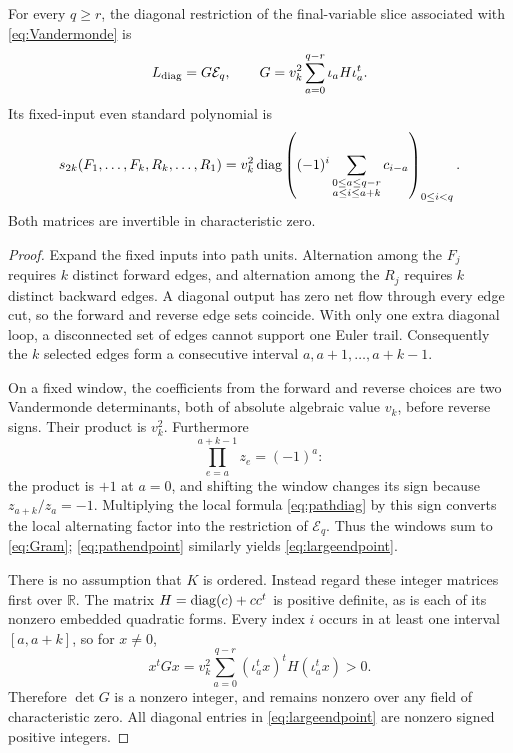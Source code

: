 \begin{proposition}\label{prop:positive}
For every $q\ge r$, the diagonal restriction of the final-variable
slice associated with \eqref{eq:Vandermonde} is
\begin{equation}\label{eq:Gram}
 L_{\rm diag}=G\mathcal E_q,
 \qquad G=v_k^2\sum_{a=0}^{q-r}\iota_aH\iota_a^t.
\end{equation}
Its fixed-input even standard polynomial is
\begin{equation}\label{eq:largeendpoint}
 s_{2k}(F_1,\ldots,F_k,R_k,\ldots,R_1)
 =v_k^2\operatorname{diag}\left((-1)^i
 \sum_{\substack{0\le a\le q-r\\a\le i\le a+k}}
 c_{i-a}\right)_{0\le i<q}.
\end{equation}
Both matrices are invertible in characteristic zero.
\end{proposition}
\begin{proof}
Expand the fixed inputs into path units. Alternation among the
$F_j$ requires $k$ distinct forward edges, and alternation among
the $R_j$ requires $k$ distinct backward edges. A diagonal output
has zero net flow through every edge cut, so the forward and reverse
edge sets coincide. With only one extra diagonal loop, a disconnected
set of edges cannot support one Euler trail. Consequently the $k$
selected edges form a consecutive interval
$a,a+1,\ldots,a+k-1$.

On a fixed window, the coefficients from the forward and reverse
choices are two Vandermonde determinants, both of absolute algebraic
value $v_k$, before reverse signs. Their product is $v_k^2$.
Furthermore
\[
 \prod_{e=a}^{a+k-1}z_e=(-1)^a:
\]
the product is $+1$ at $a=0$, and shifting the window changes its
sign because $z_{a+k}/z_a=-1$. Multiplying the local formula
\eqref{eq:pathdiag} by this sign converts the local alternating
factor into the restriction of $\mathcal E_q$. Thus the windows
sum to \eqref{eq:Gram}; \eqref{eq:pathendpoint} similarly yields
\eqref{eq:largeendpoint}.

There is no assumption that $K$ is ordered. Instead regard these
integer matrices first over $\mathbb R$. The matrix
$H=\operatorname{diag}(c)+cc^t$ is positive definite, as is each of its
nonzero embedded quadratic forms. Every index $i$ occurs in at least
one interval $[a,a+k]$, so for $x\ne0$,
\[
 x^tGx=v_k^2\sum_{a=0}^{q-r}
 (\iota_a^tx)^tH(\iota_a^tx)>0.
\]
Therefore $\det G$ is a nonzero integer, and remains nonzero over
any field of characteristic zero. All diagonal entries in
\eqref{eq:largeendpoint} are nonzero signed positive integers.
\end{proof}

